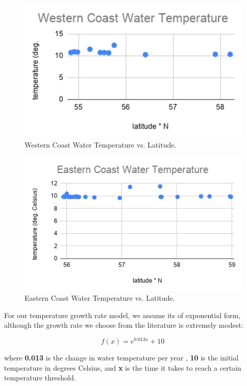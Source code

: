 \documentclass[12pt]{article}
\begin{document}
\begin{figure}[h!]
\begin{center}
\includegraphics[width=11.5cm]{West_Coast.png}
\caption{Western Coast Water Temperature vs. Latitude.}
\end{center}
\end{figure}

\begin{figure}[h!]
\begin{center}
\includegraphics[width=12cm]{East_Coast.png}
\caption{Eastern Coast Water Temperature vs. Latitude.}
\end{center}
\end{figure}

For our temperature growth rate model, we assume its of exponential form, although the growth rate we choose from the literature \cite{waterTemp} is extremely modest:

$$f(x) = e^{0.013x}+10$$

where \textbf{0.013} is the change in water temperature per year \cite{waterTemp}, \textbf{10} is the initial temperature in degrees Celsius, and \textbf{x} is the time it takes to reach a certain temperature threshold.
\end{document}
